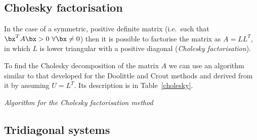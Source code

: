 \subsection{Cholesky factorisation}

In the case of a symmetric, positive definite matrix (i.e.\ such that
$\bx^T A \bx > 0 \, \, \forall \bx \ne 0$) then it is possible to
factorise the matrix as $A = L L^T$, in which $L$ is lower triangular with
a positive diagonal (\textit{Cholesky factorisation}).

To find the Cholesky decomposition of the matrix $A$ we can use an
algorithm similar to that developed for the Doolittle and Crout
methods and derived from it by assuming $U=L^T$.  Its description is
in Table~\ref{cholesky}.

\begin{table}
  \begin{center}
  \end{center}
  \caption{\label{cholesky} \it Algorithm for the Cholesky
    factorisation method}
\end{table}

\subsection{Tridiagonal systems}

